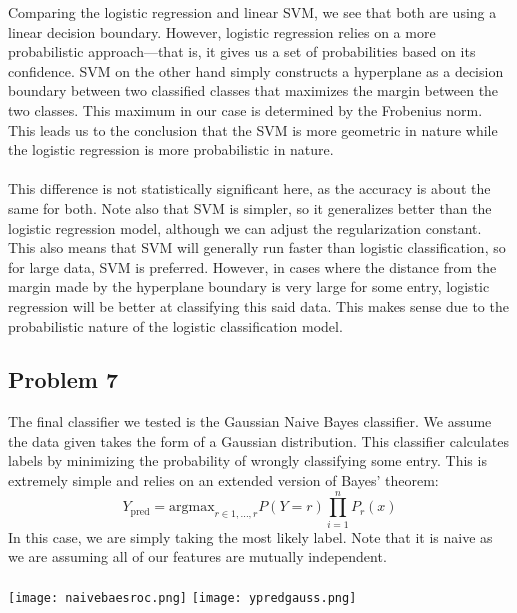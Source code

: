 \documentclass[11pt]{article}
\begin{document}
\begin{multicols}{2}
Comparing the logistic regression and linear SVM, we see that both are using a linear decision boundary. However, logistic regression relies on a more probabilistic approach—that is, it gives us a set of probabilities based on its confidence. SVM on the other hand simply constructs a hyperplane as a decision boundary between two classified classes that maximizes the margin between the two classes. This maximum in our case is determined by the Frobenius norm. This leads us to the conclusion that the SVM is more geometric in nature while the logistic regression is more probabilistic in nature. \\\\
This difference is not statistically significant here, as the accuracy is about the same for both. Note also that SVM is simpler, so it generalizes better than the logistic regression model, although we can adjust the regularization constant. This also means that SVM will generally run faster than logistic classification, so for large data, SVM is preferred. However, in cases where the distance from the margin made by the hyperplane boundary is very large for some entry, logistic regression will be better at classifying this said data. This makes sense due to the probabilistic nature of the logistic classification model. 
\subsection*{Problem 7}
The final classifier we tested is the Gaussian Naive Bayes classifier. We assume the data given takes the form of a Gaussian distribution. This classifier calculates labels by minimizing the probability of wrongly classifying some entry. This is extremely simple and relies on an extended version of Bayes' theorem: $$Y_{\text{pred}}=\text{argmax}_{r\in{1,...,r}} P(Y=r)\prod_{i=1}^n P_r(x)$$
In this case, we are simply taking the most likely label. Note that it is naive as we are assuming all of our features are mutually independent. \\\\
\texttt{[image: naivebaesroc.png]}
\texttt{[image: ypredgauss.png]}
 \\\\


\end{multicols}
\end{document}

